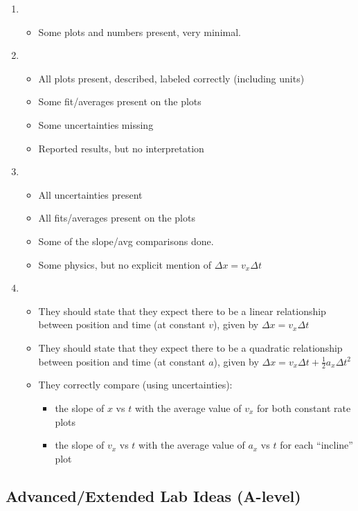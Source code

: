 \documentclass[fleqn,letterpaper]{article}
\begin{document}
\begin{enumerate}
 \item{
  \begin{itemize}
   \item{Some plots and numbers present, very minimal.}
  \end{itemize}
}
 \item{
  \begin{itemize}
   \item{All plots present, described, labeled correctly (including units)}
   \item{Some fit/averages present on the plots}
   \item{Some uncertainties missing}
   \item{Reported results, but no interpretation}
  \end{itemize}
}
 \item{
  \begin{itemize}
   \item{All uncertainties present}
   \item{All fits/averages present on the plots}
   \item{Some of the slope/avg comparisons done.}
   \item{Some physics, but no explicit mention of $\Delta x = v_x \Delta t$}
  \end{itemize}
}
 \item{
  \begin{itemize}
   \item{They should state that they expect there to be a linear relationship between position and time (at constant $v$), given by $\Delta x = v_x \Delta t$}
   \item{They should state that they expect there to be a quadratic relationship between position and time (at constant $a$), given by $\Delta x = v_x \Delta t + \frac{1}{2}a_x \Delta t^2$}
   \item{They correctly compare (using uncertainties):
    \begin{itemize}
    \item{the slope of $x$ vs $t$ with the average value of $v_x$ for both constant rate plots}
    \item{the slope of $v_x$ vs $t$ with the average value of $a_x$ vs $t$ for each ``incline'' plot}
    \end{itemize}}
  \end{itemize}
}
\end{enumerate}


\subsection*{Advanced/Extended Lab Ideas (A-level)}
\end{document}
